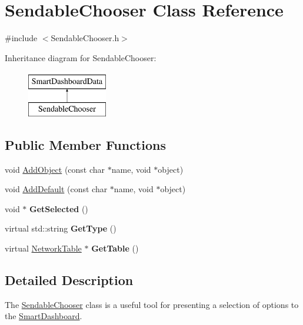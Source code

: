 \hypertarget{classSendableChooser}{
\section{SendableChooser Class Reference}
\label{classSendableChooser}
}


{\ttfamily \#include $<$SendableChooser.h$>$}

Inheritance diagram for SendableChooser:\begin{figure}[H]
\begin{center}
\leavevmode
\includegraphics[height=2.000000cm]{classSendableChooser}
\end{center}
\end{figure}
\subsection*{Public Member Functions}
\begin{DoxyCompactItemize}
\item 
void \hyperlink{classSendableChooser_aacaffd7663116d16ef33f2d0d0964c9f}{AddObject} (const char $\ast$name, void $\ast$object)
\item 
void \hyperlink{classSendableChooser_a89291124e5927cba8a208ddfde09cbb8}{AddDefault} (const char $\ast$name, void $\ast$object)
\item 
\hypertarget{classSendableChooser_affd859e1b97db54c04b754ec1451c0a9}{
void $\ast$ {\bfseries GetSelected} ()}
\label{classSendableChooser_affd859e1b97db54c04b754ec1451c0a9}

\item 
\hypertarget{classSendableChooser_a563e695a4998286504217e62fac117a5}{
virtual std::string {\bfseries GetType} ()}
\label{classSendableChooser_a563e695a4998286504217e62fac117a5}

\item 
\hypertarget{classSendableChooser_abd52a5e189602371ae369406cf6e3035}{
virtual \hyperlink{classNetworkTable}{NetworkTable} $\ast$ {\bfseries GetTable} ()}
\label{classSendableChooser_abd52a5e189602371ae369406cf6e3035}

\end{DoxyCompactItemize}


\subsection{Detailed Description}
The \hyperlink{classSendableChooser}{SendableChooser} class is a useful tool for presenting a selection of options to the \hyperlink{classSmartDashboard}{SmartDashboard}.

